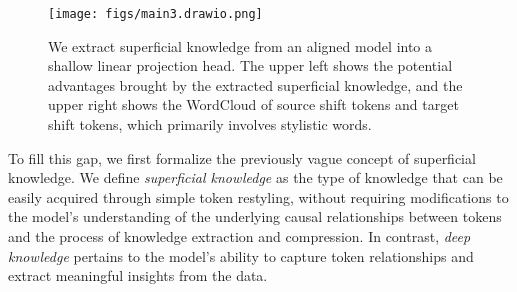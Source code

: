 

\begin{figure*}[t]
  \centering
  \texttt{[image: figs/main3.drawio.png]}
  \caption{We extract superficial knowledge from an aligned model into a shallow linear projection head. The upper left shows the potential advantages brought by the extracted superficial knowledge, and the upper right shows the WordCloud of source shift tokens and target shift tokens, which primarily involves stylistic words.}
  \label{fig:main}
\end{figure*}

To fill this gap, we first formalize the previously vague concept of superficial knowledge. We define \textit{superficial knowledge} as the type of knowledge that can be easily acquired through simple token restyling, without requiring modifications to the model's understanding of the underlying causal relationships between tokens and the process of knowledge extraction and compression. In contrast, \textit{deep knowledge} pertains to the model's ability to capture token relationships and extract meaningful insights from the data.

